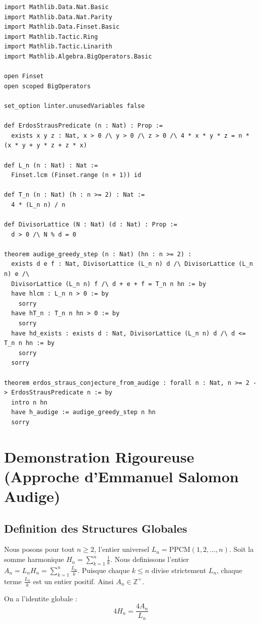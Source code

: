 \documentclass[11pt,a4paper]{article}
\begin{document}
\begin{lstlisting}
import Mathlib.Data.Nat.Basic
import Mathlib.Data.Nat.Parity
import Mathlib.Data.Finset.Basic
import Mathlib.Tactic.Ring
import Mathlib.Tactic.Linarith
import Mathlib.Algebra.BigOperators.Basic

open Finset
open scoped BigOperators

set_option linter.unusedVariables false

def ErdosStrausPredicate (n : Nat) : Prop :=
  exists x y z : Nat, x > 0 /\ y > 0 /\ z > 0 /\ 4 * x * y * z = n * (x * y + y * z + z * x)

def L_n (n : Nat) : Nat :=
  Finset.lcm (Finset.range (n + 1)) id

def T_n (n : Nat) (h : n >= 2) : Nat :=
  4 * (L_n n) / n

def DivisorLattice (N : Nat) (d : Nat) : Prop :=
  d > 0 /\ N % d = 0

theorem audige_greedy_step (n : Nat) (hn : n >= 2) :
  exists d e f : Nat, DivisorLattice (L_n n) d /\ DivisorLattice (L_n n) e /\
  DivisorLattice (L_n n) f /\ d + e + f = T_n n hn := by
  have hlcm : L_n n > 0 := by
    sorry
  have hT_n : T_n n hn > 0 := by
    sorry
  have hd_exists : exists d : Nat, DivisorLattice (L_n n) d /\ d <= T_n n hn := by
    sorry
  sorry

theorem erdos_straus_conjecture_from_audige : forall n : Nat, n >= 2 -> ErdosStrausPredicate n := by
  intro n hn
  have h_audige := audige_greedy_step n hn
  sorry
\end{lstlisting}

\section{Demonstration Rigoureuse (Approche d'Emmanuel Salomon Audige)}

\subsection{Definition des Structures Globales}

Nous posons pour tout $n \ge 2$, l'entier universel $L_n = \text{PPCM}(1, 2, \dots, n)$.
Soit la somme harmonique $H_n = \sum_{k=1}^n \frac{1}{k}$.
Nous definissons l'entier $A_n = L_n H_n = \sum_{k=1}^n \frac{L_n}{k}$. Puisque chaque $k \le n$ divise strictement $L_n$, chaque terme $\frac{L_n}{k}$ est un entier positif. Ainsi $A_n \in \mathbb{Z}^{+}$.

On a l'identite globale :
$$ 4 H_n = \frac{4 A_n}{L_n} $$
\end{document}

